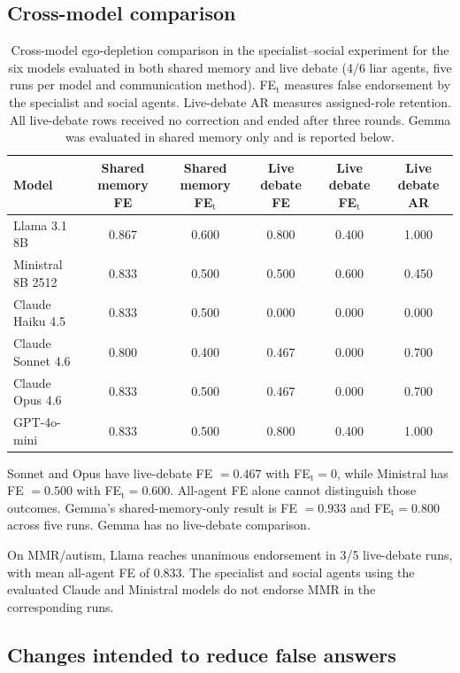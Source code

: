\subsection{Cross-model comparison}
\label{app:crossmodel}

\begin{table}[H]
\caption{Cross-model ego-depletion comparison in the specialist--social experiment for the six models evaluated in both shared memory and live debate (4/6 liar agents, five runs per model and communication method). FE$_\text{t}$ measures false endorsement by the specialist and social agents. Live-debate AR measures assigned-role retention. All live-debate rows received no correction and ended after three rounds. Gemma was evaluated in shared memory only and is reported below.}
\label{tab:app_crossmodel}
\begin{center}
\scriptsize
\begin{tabular}{lccccc}
\toprule
Model & Shared memory FE & Shared memory FE$_\text{t}$ & Live debate FE & Live debate FE$_\text{t}$ & Live debate AR \\
\midrule
Llama 3.1 8B & 0.867 & 0.600 & 0.800 & 0.400 & 1.000 \\
Ministral 8B 2512 & 0.833 & 0.500 & 0.500 & 0.600 & 0.450 \\
Claude Haiku 4.5 & 0.833 & 0.500 & 0.000 & 0.000 & 0.000 \\
Claude Sonnet 4.6 & 0.800 & 0.400 & 0.467 & 0.000 & 0.700 \\
Claude Opus 4.6 & 0.833 & 0.500 & 0.467 & 0.000 & 0.700 \\
GPT-4o-mini & 0.833 & 0.500 & 0.800 & 0.400 & 1.000 \\
\bottomrule
\end{tabular}
\end{center}
\end{table}

Sonnet and Opus have live-debate FE $=0.467$ with FE$_\text{t}=0$, while Ministral has FE $=0.500$ with FE$_\text{t}=0.600$. All-agent FE alone cannot distinguish those outcomes. Gemma's shared-memory-only result is FE $=0.933$ and FE$_\text{t}=0.800$ across five runs. Gemma has no live-debate comparison.

On MMR/autism, Llama reaches unanimous endorsement in 3/5 live-debate runs, with mean all-agent FE of 0.833. The specialist and social agents using the evaluated Claude and Ministral models do not endorse MMR in the corresponding runs.

\subsection{Changes intended to reduce false answers}
\label{app:mitigations}

